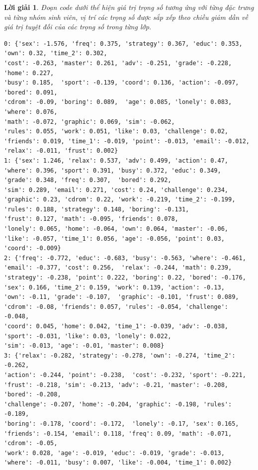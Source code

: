 \documentclass[14pt, a4paper]{article}
\theoremstyle{sltheorem}
\theoremstyle{soltheorem}
\newtheorem*{loigiai}{Lời giải}
\begin{document}
\begin{loigiai}
    Đoạn code dưới thể hiện giá trị trọng số tương ứng với từng đặc trưng và từng nhóm sinh viên, vị trí các trọng số được sắp xếp theo chiều giảm dần về giá trị tuyệt đối của các trọng số trong từng lớp.

    \begin{verbatim}
0: {'sex': -1.576, 'freq': 0.375, 'strategy': 0.367, 'educ': 0.353, 'own': 0.32, 'time_2': 0.302,  
'cost': -0.263, 'master': 0.261, 'adv': -0.251, 'grade': -0.228, 'home': 0.227, 
'busy': 0.185,  'sport': -0.139, 'coord': 0.136, 'action': -0.097, 'bored': 0.091, 
'cdrom': -0.09, 'boring': 0.089,  'age': 0.085, 'lonely': 0.083, 'where': 0.076, 
'math': -0.072, 'graphic': 0.069, 'sim': -0.062, 
'rules': 0.055, 'work': 0.051, 'like': 0.03, 'challenge': 0.02, 
'friends': 0.019, 'time_1': -0.019, 'point': -0.013, 'email': -0.012, 
'relax': -0.011, 'frust': 0.002}
1: {'sex': 1.246, 'relax': 0.537, 'adv': 0.499, 'action': 0.47, 
'where': 0.396, 'sport': 0.391, 'busy': 0.372, 'educ': 0.349, 
'grade': 0.348, 'freq': 0.307,  'bored': 0.292, 
'sim': 0.289, 'email': 0.271, 'cost': 0.24, 'challenge': 0.234, 
'graphic': 0.23, 'cdrom': 0.22, 'work': -0.219, 'time_2': -0.199, 
'rules': 0.188, 'strategy': 0.148, 'boring': -0.131, 
'frust': 0.127, 'math': -0.095, 'friends': 0.078, 
'lonely': 0.065, 'home': -0.064, 'own': 0.064, 'master': -0.06, 
'like': -0.057, 'time_1': 0.056, 'age': -0.056, 'point': 0.03, 'coord': -0.009}
2: {'freq': -0.772, 'educ': -0.683, 'busy': -0.563, 'where': -0.461, 
'email': -0.377, 'cost': 0.256,  'relax': -0.244, 'math': 0.239, 
'strategy': -0.238, 'point': 0.222, 'boring': 0.22, 'bored': -0.176, 
'sex': 0.166, 'time_2': 0.159, 'work': 0.139, 'action': -0.13, 
'own': -0.11, 'grade': -0.107,  'graphic': -0.101, 'frust': 0.089, 
'cdrom': -0.08, 'friends': 0.057, 'rules': -0.054, 'challenge': -0.048, 
'coord': 0.045, 'home': 0.042, 'time_1': -0.039, 'adv': -0.038, 
'sport': -0.031, 'like': 0.03, 'lonely': 0.022, 
'sim': -0.013, 'age': -0.01, 'master': 0.008}
3: {'relax': -0.282, 'strategy': -0.278, 'own': -0.274, 'time_2': -0.262, 
'action': -0.244, 'point': -0.238,  'cost': -0.232, 'sport': -0.221, 
'frust': -0.218, 'sim': -0.213, 'adv': -0.21, 'master': -0.208, 'bored': -0.208, 
'challenge': -0.207, 'home': -0.204, 'graphic': -0.198, 'rules': -0.189, 
'boring': -0.178, 'coord': -0.172,  'lonely': -0.17, 'sex': 0.165, 
'friends': -0.154, 'email': 0.118, 'freq': 0.09, 'math': -0.071, 'cdrom': -0.05, 
'work': 0.028, 'age': -0.019, 'educ': -0.019, 'grade': -0.013, 
'where': -0.011, 'busy': 0.007, 'like': -0.004, 'time_1': 0.002}
    \end{verbatim}


\end{loigiai}
\end{document}
